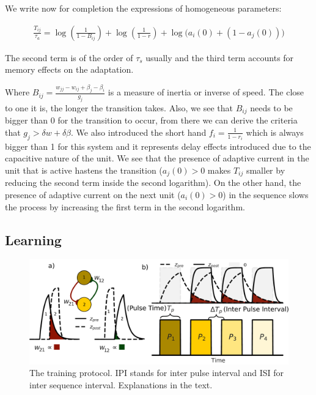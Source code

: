 \documentclass[10pt,a4paper]{article}
\begin{document}
We write now for completion the expressions of homogeneous parameters:

\begin{align*}
\frac{T_{ij}}{\tau_a} = \log \left(\frac{1}{1 - B_{ij}} \right) + \log \left( \frac{1}{1 - r} \right) + \log \bigg( a_i(0) + (1 - a_j(0)) \bigg) 
\end{align*}

The second term is of the order of $\tau_s$ usually and the third term accounts for memory effects on the adaptation.

Where $B_{ij} = \frac{w_{jj} - w_{ij} + \beta_j - \beta_i}{g_j}$ is a measure of inertia or inverse of speed. The close to one it is, the longer the transition takes. Also, we see that $B_{ij}$ needs to be bigger than 0 for the transition to occur, from there we can derive the criteria that $g_j > \delta w + \delta \beta$. We also introduced the short hand $f_i = \frac{1}{1 - r_i}$ which is always bigger than 1 for this system and it represents delay effects introduced due to the capacitive nature of the unit.  We see that the presence of adaptive current in the unit that is active hastens the transition ($a_j(0) > 0$  makes $T_{ij}$ smaller by reducing the second term inside the second logarithm). On the other hand, the presence of adaptive current on the next unit ($a_i(0) > 0$) in the sequence slows the process by increasing the first term in the second logarithm. 

\subsection{Learning}
\begin{figure}[H]
\centering
\includegraphics[scale=1.40]{protocol.pdf}
\caption{The training protocol. IPI stands for inter pulse interval and ISI for inter sequence interval. Explanations in the text.}
\label{fig:training_protocol}
\end{figure}
\end{document}
